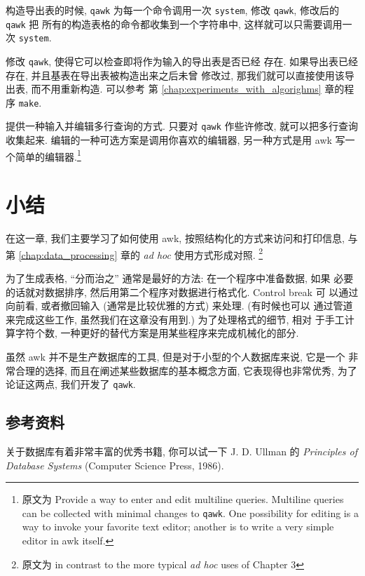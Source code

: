 \begin{exercise}
	构造导出表的时候, \texttt{qawk} 为每一个命令调用一次
	\texttt{system}, 修改 \texttt{qawk}, 修改后的 \texttt{qawk} 把
	所有的构造表格的命令都收集到一个字符串中, 这样就可以只需要调用一次
	\texttt{system}. 
\end{exercise}

\begin{exercise}
	修改 \texttt{qawk}, 使得它可以检查即将作为输入的导出表是否已经
	存在. 如果导出表已经存在, 并且基表在导出表被构造出来之后未曾
	修改过, 那我们就可以直接使用该导出表, 而不用重新构造. 可以参考
	第 \ref{chap:experiments_with_algorighms} 章的程序 \texttt{make}.
\end{exercise}

\begin{exercise}
	提供一种输入并编辑多行查询的方式. 只要对 \texttt{qawk} 作些许修改,
	就可以把多行查询收集起来. 编辑的一种可选方案是调用你喜欢的编辑器,
	另一种方式是用 awk 写一个简单的编辑器.\footnote{原文为 Provide a
		way to enter and edit multiline queries. Multiline queries
		can be collected with minimal changes to \texttt{qawk}. One
		possibility for editing is a way to invoke your favorite
		text editor; another is to write a very simple editor in
	awk itself.}
\end{exercise}

\section{小结}
\label{sec:reports_and_databases_summary}
在这一章, 我们主要学习了如何使用 awk, 按照结构化的方式来访问和打印信息,
与第 \ref{chap:data_processing} 章的 \textit{ad hoc} 使用方式形成对照.
\footnote{原文为 in contrast to the more typical \textit{ad hoc} uses of
Chapter 3}

为了生成表格, ``分而治之'' 通常是最好的方法: 在一个程序中准备数据, 如果 
必要的话就对数据排序, 然后用第二个程序对数据进行格式化. Control break 可
以通过向前看, 或者撤回输入 (通常是比较优雅的方式) 来处理. (有时候也可以
通过管道来完成这些工作, 虽然我们在这章没有用到.) 为了处理格式的细节, 相对
于手工计算字符个数, 一种更好的替代方案是用某些程序来完成机械化的部分.

虽然 awk 并不是生产数据库的工具, 但是对于小型的个人数据库来说, 它是一个
非常合理的选择, 而且在阐述某些数据库的基本概念方面, 它表现得也非常优秀,
为了论证这两点, 我们开发了 \texttt{qawk}.

\subsection*{参考资料}
关于数据库有着非常丰富的优秀书籍, 你可以试一下 J. D. Ullman 的
\textit{Principles of Database Systems} (Computer Science Press, 1986).

